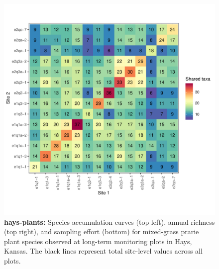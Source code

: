 \documentclass[11pt, oneside]{article}
\begin{document}
\begin{figure}[h!]
\includegraphics[scale = 0.4]{hays-plants-compagnoni_spp_shared.pdf}
\caption{{\bf hays-plants:} Species accumulation curves (top left),  annual richness (top right), and sampling effort (bottom)  for mixed-grass prarie plant species observed at long-term monitoring plots in Hays, Kansas. The black lines represent total site-level values across all plots.}
\label{hays-plants}
\end{figure}
\end{document}
